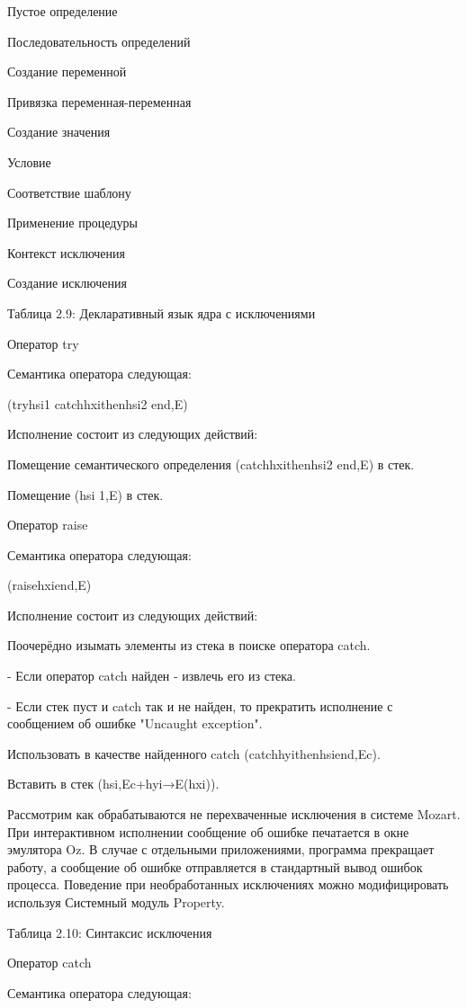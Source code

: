 Пустое определение

Последовательность определений

Создание переменной

Привязка переменная-переменная

Создание значения

Условие

Соответствие шаблону

Применение процедуры

Контекст исключения

Создание исключения

Таблица 2.9: Декларативный язык ядра с исключениями

Оператор try

Семантика оператора следующая:

(tryhsi1 catchhxithenhsi2 end,E)

Исполнение состоит из следующих действий:

Помещение семантического определения (catchhxithenhsi2 end,E) в стек.

Помещение  (hsi 1,E) в стек.

Оператор raise

Семантика оператора следующая:

(raisehxiend,E)

Исполнение состоит из следующих действий:

Поочерёдно изымать элементы из стека в поиске оператора catch.

- Если оператор catch найден - извлечь его из стека.

- Если стек пуст и catch так и не найден, то прекратить исполнение с сообщением об ошибке "Uncaught exception".

Использовать в качестве найденного catch (catchhyithenhsiend,Ec).

Вставить в стек (hsi,Ec+{hyi→E(hxi)}).

Рассмотрим как обрабатываются не перехваченные исключения в системе Mozart. При интерактивном исполнении сообщение об ошибке печатается в окне эмулятора Oz. В случае с отдельными приложениями, программа прекращает работу, а сообщение об ошибке отправляется в стандартный вывод ошибок процесса. Поведение при необработанных исключениях можно модифицировать используя Системный модуль Property.

Таблица 2.10: Синтаксис исключения

Оператор catch

Семантика оператора следующая:

